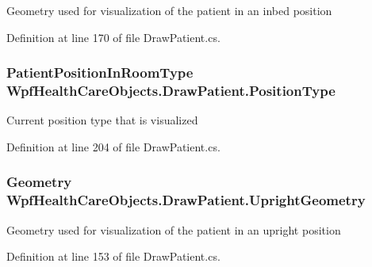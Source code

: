 Geometry used for visualization of the patient in an inbed position 



Definition at line 170 of file Draw\+Patient.\+cs.

\subsubsection[{\texorpdfstring{Position\+Type}{PositionType}}]{\setlength{\rightskip}{0pt plus 5cm}Patient\+Position\+In\+Room\+Type Wpf\+Health\+Care\+Objects.\+Draw\+Patient.\+Position\+Type\hspace{0.3cm}{\ttfamily [get]}}\hypertarget{class_wpf_health_care_objects_1_1_draw_patient_a8aeaabe27f049b0f857411eb2d61bb86}{}\label{class_wpf_health_care_objects_1_1_draw_patient_a8aeaabe27f049b0f857411eb2d61bb86}


Current position type that is visualized 



Definition at line 204 of file Draw\+Patient.\+cs.

\subsubsection[{\texorpdfstring{Upright\+Geometry}{UprightGeometry}}]{\setlength{\rightskip}{0pt plus 5cm}Geometry Wpf\+Health\+Care\+Objects.\+Draw\+Patient.\+Upright\+Geometry\hspace{0.3cm}{\ttfamily [get]}}\hypertarget{class_wpf_health_care_objects_1_1_draw_patient_a3f80edc921ff5783980814c69fb3be92}{}\label{class_wpf_health_care_objects_1_1_draw_patient_a3f80edc921ff5783980814c69fb3be92}


Geometry used for visualization of the patient in an upright position 



Definition at line 153 of file Draw\+Patient.\+cs.

